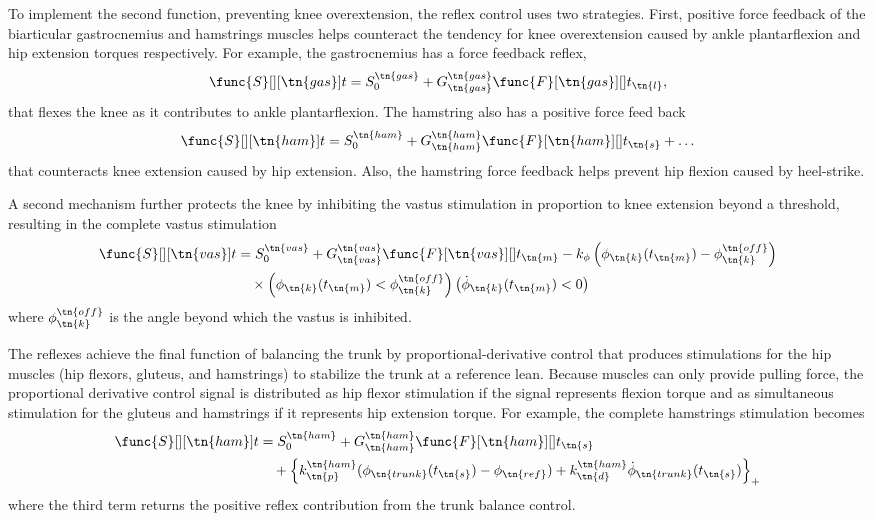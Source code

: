 To implement the second function, preventing knee overextension, the reflex
control uses two strategies. First, positive force feedback of the biarticular
gastrocnemius and hamstrings muscles helps counteract the tendency for knee
overextension caused by ankle plantarflexion and hip extension torques
respectively. For example, the gastrocnemius has a force feedback reflex,
\begin{align}
    \func{S}[][\tn{gas}]{t} = S_0^\tn{gas} + 
        G_\tn{gas}^\tn{gas} \func{F}[\tn{gas}][]{t_\tn{l}},
\end{align}
that flexes the knee as it contributes to ankle plantarflexion. The hamstring
also has a positive force feed back
\begin{align}
    \func{S}[][\tn{ham}]{t} = S_0^\tn{ham} + 
        G_\tn{ham}^\tn{ham} \func{F}[\tn{ham}][]{t_\tn{s}} + \ldots
        \label{eq:ham_stim}
\end{align}
that counteracts knee extension caused by hip extension. Also, the hamstring
force feedback helps prevent hip flexion caused by heel-strike.

A second mechanism further protects the knee by inhibiting the vastus
stimulation in proportion to knee extension beyond a threshold, resulting in
the complete vastus stimulation
\begin{align}
    \func{S}[][\tn{vas}]{t} &= S_0^\tn{vas} + 
        G_\tn{vas}^\tn{vas} \func{F}[\tn{vas}][]{t_\tn{m}} 
            -k_\phi \left(\phi_\tn{k}(t_\tn{m}) - \phi_\tn{k}^\tn{off} \right)
            \notag \\
        &\quad \times 
            \left( \phi_\tn{k}(t_\tn{m}) < \phi_\tn{k}^\tn{off} \right)
            \left( \dot \phi_\tn{k}(t_\tn{m}) < 0\right)
\end{align}
where $\phi_\tn{k}^\tn{off}$ is the angle beyond which the vastus is inhibited.

The reflexes achieve the final function of balancing the trunk by
proportional-derivative control that produces stimulations for the hip muscles
(hip flexors, gluteus, and hamstrings) to stabilize the trunk at a reference
lean. Because muscles can only provide pulling force, the proportional derivative
control signal is distributed as hip flexor stimulation if the signal represents
flexion torque and as simultaneous stimulation for the gluteus and hamstrings if
it represents hip extension torque. For example, the complete hamstrings
stimulation becomes
\begin{align}
    \func{S}[][\tn{ham}]{t} &= S_0^\tn{ham} + 
        G_\tn{ham}^\tn{ham} \func{F}[\tn{ham}][]{t_\tn{s}} \notag\\
            &\quad +  \left\{ k_\tn{p}^\tn{ham} 
            (\phi_\tn{trunk}(t_\tn{s}) - \phi_{\tn{ref}}) 
            + k_\tn{d}^\tn{ham} \dot{\phi}_{\tn{trunk}}(t_\tn{s}) \right\}_+ 
\end{align}
where the third term returns the positive reflex contribution from the trunk
balance control. 

